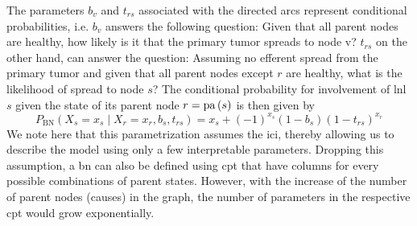 \documentclass[\relativeRoot/main.tex]{subfiles}
\begin{document}
The parameters $b_v$ and $t_{rs}$ associated with the directed arcs represent conditional probabilities, i.e. $b_v$ answers the following question: Given that all parent nodes are healthy, how likely is it that the primary tumor spreads to node v? $t_{rs}$ on the other hand, can answer the question: Assuming no efferent spread from the primary tumor and given that all parent nodes except $r$ are healthy, what is the likelihood of spread to node $s$? The conditional probability for involvement of \gls{lnl} $s$ given the state of its parent node $r = \operatorname{pa}{(s)}$ is then given by
%
\begin{equation} \label{eq:bn_cp}
    P_\text{BN} \left( X_s = x_s \mid X_r = x_r, b_s, t_{rs} \right) = x_s + (-1)^{x_s} (1 - b_s) (1 - t_{rs})^{x_r}
\end{equation}
%
We note here that this parametrization assumes the \acrlong{ici}, thereby allowing us to describe the model using only a few interpretable parameters. Dropping this assumption, a \gls{bn} can also be defined using \gls{cpt} that have columns for every possible combinations of parent states. However, with the increase of the number of parent nodes (causes) in the graph, the number of parameters in the respective \gls{cpt} would grow exponentially.
\end{document}
